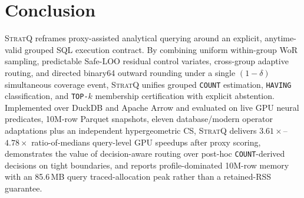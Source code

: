 \section{Conclusion}
\label{sec:conclusion}

\textsc{StratQ} reframes proxy-assisted analytical querying around an explicit, anytime-valid grouped SQL execution contract.
By combining uniform within-group WoR sampling, predictable Safe-LOO residual control variates, cross-group adaptive routing, and directed binary64 outward rounding under a single $(1-\delta)$ simultaneous coverage event, \textsc{StratQ} unifies grouped \texttt{COUNT} estimation, \texttt{HAVING} classification, and \texttt{TOP-$k$} membership certification with explicit abstention.
Implemented over DuckDB and Apache Arrow and evaluated on live GPU neural predicates, 10M-row Parquet snapshots, eleven database/modern operator adaptations plus an independent hypergeometric CS, \textsc{StratQ} delivers $3.61\times$--$4.78\times$ ratio-of-medians query-level GPU speedups after proxy scoring, demonstrates the value of decision-aware routing over post-hoc \texttt{COUNT}-derived decisions on tight boundaries, and reports profile-dominated 10M-row memory with an 85.6\,MB query traced-allocation peak rather than a retained-RSS guarantee.
